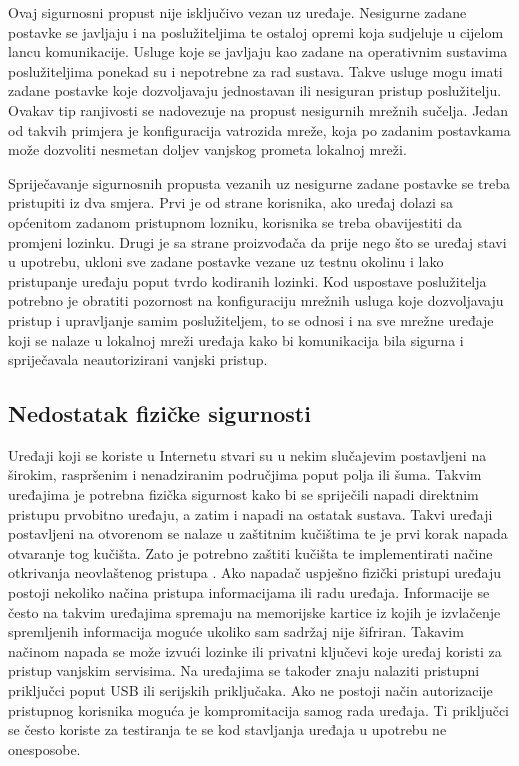 \documentclass[times, utf8, diplomski]{fer}
\begin{document}
Ovaj sigurnosni propust nije isključivo vezan uz uređaje. Nesigurne zadane postavke se javljaju i na poslužiteljima te ostaloj opremi koja sudjeluje u cijelom lancu komunikacije. Usluge koje se javljaju kao zadane na operativnim sustavima poslužiteljima ponekad su i nepotrebne za rad sustava. Takve usluge mogu imati zadane postavke koje dozvoljavaju jednostavan ili nesiguran pristup poslužitelju. Ovakav tip ranjivosti se nadovezuje na propust nesigurnih mrežnih sučelja. Jedan od takvih primjera je konfiguracija vatrozida mreže, koja po zadanim postavkama može dozvoliti nesmetan doljev vanjskog prometa lokalnoj mreži.  

Spriječavanje sigurnosnih propusta vezanih uz nesigurne zadane postavke se treba pristupiti iz dva smjera. Prvi je od strane korisnika, ako uređaj dolazi sa općenitom zadanom pristupnom lozniku, korisnika se treba obavijestiti da promjeni lozinku. Drugi je sa strane proizvođača da prije nego što se uređaj stavi u upotrebu, ukloni sve zadane postavke vezane uz testnu okolinu i lako pristupanje uređaju poput tvrdo kodiranih lozinki. Kod uspostave poslužitelja potrebno je obratiti pozornost na konfiguraciju mrežnih usluga koje dozvoljavaju pristup i upravljanje samim poslužiteljem, to se odnosi i na sve mrežne uređaje koji se nalaze u lokalnoj mreži uređaja kako bi komunikacija bila sigurna i spriječavala neautorizirani vanjski pristup.

\subsection{Nedostatak fizičke sigurnosti}
Uređaji koji se koriste u Internetu stvari su u nekim slučajevim postavljeni na širokim, raspršenim  i nenadziranim područjima poput polja ili šuma. Takvim uređajima je potrebna fizička sigurnost kako bi se spriječili napadi direktnim pristupu prvobitno uređaju, a zatim i napadi na ostatak sustava. Takvi uređaji postavljeni na otvorenom se nalaze u zaštitnim kučištima te je prvi korak napada otvaranje tog kučišta. Zato je potrebno zaštiti kučišta te implementirati načine otkrivanja neovlaštenog pristupa . Ako napadač uspješno fizički pristupi uređaju postoji nekoliko načina pristupa informacijama ili radu uređaja. Informacije se često na takvim uređajima spremaju na memorijske kartice iz kojih je izvlačenje spremljenih informacija moguće ukoliko sam sadržaj nije šifriran. Takavim načinom napada se može izvući lozinke ili privatni ključevi koje uređaj koristi za pristup vanjskim servisima. Na uređajima se također znaju nalaziti pristupni priključci poput USB ili serijskih priključaka. Ako ne postoji način autorizacije pristupnog korisnika moguća je kompromitacija samog rada uređaja. Ti priključci se često koriste za testiranja te se kod stavljanja uređaja u upotrebu ne onesposobe.
\end{document}
